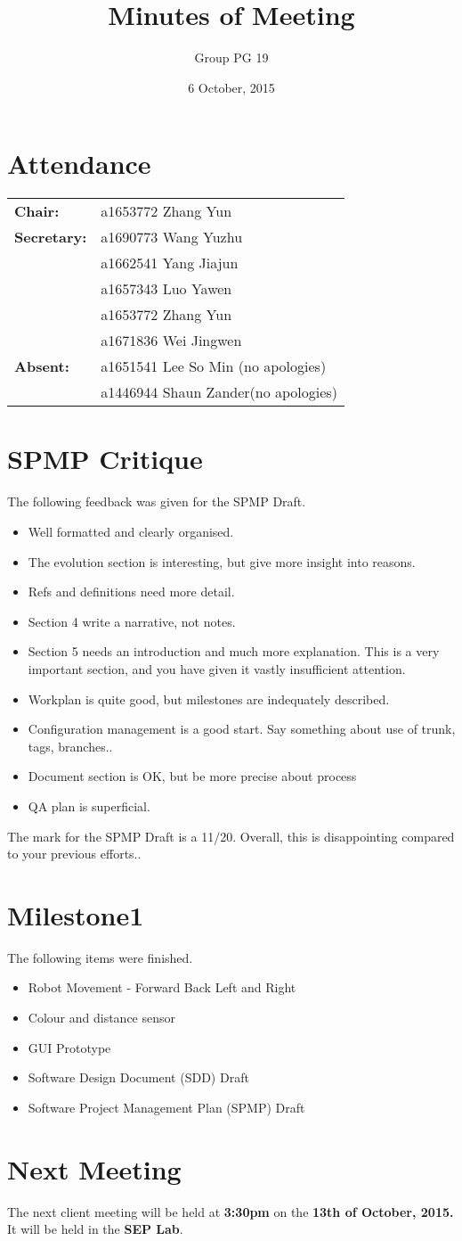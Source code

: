 \documentclass[a4paper]{article}
\title{Minutes of Meeting}
\author{Group PG 19}
\date{6 October, 2015}
\begin{document}
\maketitle
\section*{Attendance}
\begin{tabular}{l l}
\textbf{Chair:} 
&a1653772 Zhang Yun\\
\textbf{Secretary:}&a1690773 Wang Yuzhu\\
&a1662541 Yang Jiajun\\
&a1657343 Luo Yawen\\
&a1653772 Zhang Yun\\
&a1671836 Wei Jingwen\\
\textbf{Absent:}&a1651541 Lee So Min (no apologies)\\ &a1446944 Shaun Zander(no apologies)
\end{tabular}

\section{SPMP Critique}
The following feedback was given for the SPMP Draft.
\begin{itemize}
	\item Well formatted and clearly organised.
	\item The evolution section is interesting, but give more insight into reasons.
	\item Refs and definitions need more detail.
	\item Section 4 write a narrative, not notes.
	\item Section 5 needs an introduction and much more explanation. This is a very important section, and you have given it vastly insufficient attention.
	\item Workplan is quite good, but milestones are indequately described.
	\item Configuration management is a good start. Say something about use of trunk, tags, branches..
	\item Document section is OK, but be more precise about process
	\item QA plan is superficial.
	
\end{itemize}
The mark for the SPMP Draft is a 11/20. Overall, this is disappointing compared to your previous efforts..


\section{Milestone1}
The following items were finished.
\begin{itemize}
	\item Robot Movement - Forward Back Left and Right
	\item Colour and distance sensor
	\item GUI Prototype
	\item Software Design Document (SDD) Draft
	\item Software Project Management Plan (SPMP) Draft
\end{itemize}

\section{Next Meeting}
The next client meeting will be held at \textbf{3:30pm} on the \textbf{13th of October, 2015.} It will be held in the \textbf{SEP Lab}.
\end{document}
